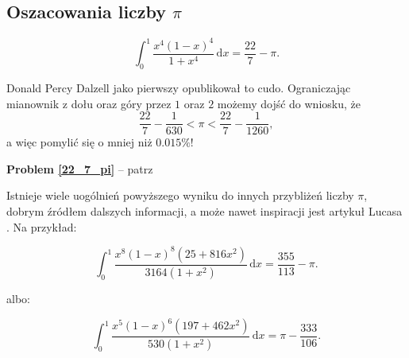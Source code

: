 \subsection{Oszacowania liczby $\pi$}
\begin{problem}
\label{22_7_pi}%
\begin{equation}
    \int_0^1 \frac{x^4(1-x)^4}{1 + x^4} \,\mathrm{d}x = \frac{22}{7} - \pi.
\end{equation}
\end{problem}

Donald Percy Dalzell \cite{dalzell44} jako pierwszy opublikował to cudo.
Ograniczając mianownik z dołu oraz góry przez $1$ oraz $2$ możemy dojść do wniosku, że
\begin{equation}
    \frac{22}{7} - \frac {1}{630} < \pi < \frac{22}{7} - \frac{1}{1260},
\end{equation}
a więc pomylić się o mniej niż $0.015\%$!

\textbf{Problem \ref{22_7_pi}} -- patrz \cite[s. 24]{nahin15}

Istnieje wiele uogólnień powyższego wyniku do innych przybliżeń liczby $\pi$, dobrym źródłem dalszych informacji, a może nawet inspiracji jest artykuł Lucasa \cite{lucas05}.
Na przykład:

\begin{problem}
\begin{equation}
    \int_0^1 \frac {x^8(1-x)^8 (25+816x^2)}{3164 (1+x^2)} \,\mathrm{d} x = \frac {355}{113} - \pi.
\end{equation}
\end{problem}

albo:

\begin{problem}
\begin{equation}
    \int_0^1 \frac{x^5 ( 1-x)^6 (197 + 462 x^2)}{530 (1+x^2)} \,\mathrm{d}x = \pi - \frac{333}{106}.
\end{equation}
\end{problem}